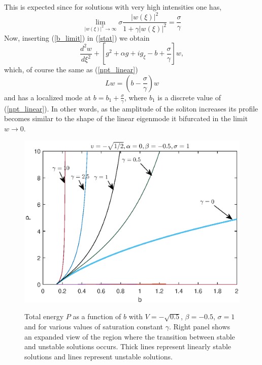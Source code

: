 \documentclass[aps,pre,showpacs,twocolumn]{revtex4}
\begin{document}
This is expected since for solutions with very high intensities one has,
\begin{equation}
\lim_{|w(\xi)|^2\to\infty}{\sigma\frac{|w(\xi)|^2}{1+\gamma|w(\xi)|^2}}=\frac{\sigma}{\gamma}
\label{b_limit}
\end{equation}
Now, inserting (\ref{b_limit}) in (\ref{stat}) we obtain
\begin{equation}
\frac{d^{2}w}{d\xi^{2}}+\left[ g^2+\alpha g+i g_\xi -b+\frac{\sigma}{\gamma}\right]w,
\end{equation}
which, of course the same as (\ref{npt_linear})
\begin{equation}
Lw=(b-\frac{\sigma}{\gamma})w
\end{equation}
and has a localized mode at $b=b_1+\frac{\sigma}{\gamma}$, where $b_1$ is a discrete value of (\ref{npt_linear}). In other words, as the amplitude of the soliton increases its profile becomes similar to the shape of the linear eigenmode it bifurcated in the limit $w\to 0$.
\begin{figure}[!htb]
\begin{center}
\scalebox{.59} {\includegraphics{branches_V-05_ds-05_c0_sigma1_final1.eps}}
\end{center}
\caption{Total energy $P$ as a function of $b$ with $V=-\sqrt{0.5}$, $\beta=-0.5$, $\sigma=1$ and for various values of saturation constant $\gamma$. Right panel shows an expanded view of the region where the transition between stable and unstable solutions occurs. Thick lines represent linearly stable solutions and lines represent unstable solutions.}
\label{fig:gamma_branchesV-05sigma1}
\end{figure}
\end{document}
